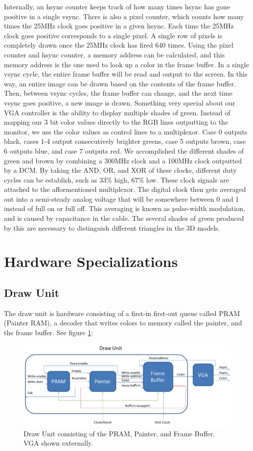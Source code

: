 \documentclass[onecolumn]{IEEEtran}
\begin{document}
Internally, an hsync counter keeps track of how many times hsync has gone positive in a single vsync.  There is also a pixel counter, which counts how many times the 25MHz clock goes positive in a given hsync.  Each time the 25MHz clock goes positive corresponds to a single pixel.  A single row of pixels is completely drawn once the 25MHz clock has fired 640 times.  Using the pixel counter and hsync counter, a memory address can be calculated, and this memory address is the one used to look up a color in the frame buffer.  In a single vsync cycle, the entire frame buffer will be read and output to the screen.  In this way, an entire image can be drawn based on the contents of the frame buffer.  Then, between vsync cycles, the frame buffer can change, and the next time vsync goes positive, a new image is drawn.  Something very special about our VGA controller is the ability to display multiple shades of green.  Instead of mapping our 3 bit color values directly to the RGB lines outputting to the monitor, we use the color values as control lines to a multiplexor.  Case 0 outputs black, cases 1-4 output consecutively brighter greens, case 5 outputs brown, case 6 outputs blue, and case 7 outputs red.  We accomplished the different shades of green and brown by combining a 300MHz clock and a 100MHz clock outputted by a DCM.  By taking the AND, OR, and XOR of these clocks, different duty cycles can be establish, such as 33\% high, 67\% low.  These clock signals are attached to the afformentioned multiplexor.  The digital clock then gets averaged out into a semi-steady analog voltage that will be somewhere between 0 and 1 instead of full on or full off.  This averaging is known as pulse-width modulation, and is caused by capacitance in the cable.  The several shades of green produced by this are necessary to distinguish different triangles in the 3D models.

\section{Hardware Specializations}
\subsection{Draw Unit}
The draw unit is hardware consisting of a first-in first-out queue called PRAM (Painter RAM), a decoder that writes colors to memory called the painter, and the frame buffer.  See figure \ref{fig:draw}:

\begin{figure}[H]
	\centering
	\includegraphics[width=1.0\textwidth]{draw.png}
	\caption{Draw Unit consisting of the PRAM, Painter, and Frame Buffer. VGA shown externally.}
	\label{fig:draw}
\end{figure}
\end{document}
